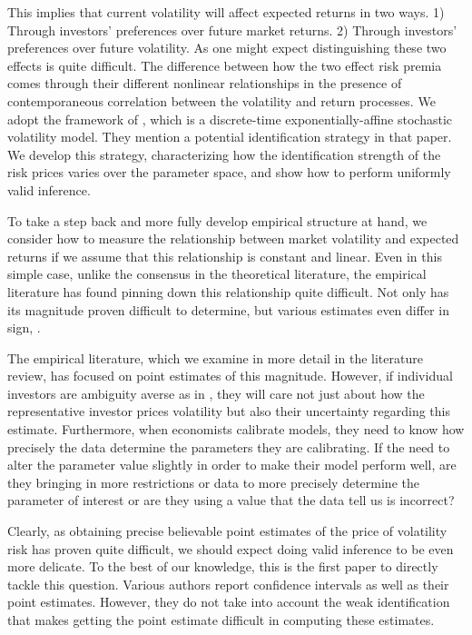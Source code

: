 \documentclass[11pt, letterpaper, twoside, final]{article}
\begin{document}
This implies that current volatility will affect expected returns in two ways. 1) Through investors' preferences
over future market returns. 2) Through investors' preferences over future volatility. 
As one might expect distinguishing these two effects is quite difficult. 
The difference between how the two effect risk premia comes through their different nonlinear relationships in the
presence of contemporaneous correlation between the volatility and return processes. 
We adopt the framework of \textcite{khrapov2016affine}, which is a discrete-time exponentially-affine stochastic
volatility model.
They mention a potential identification strategy in that paper. 
We develop this strategy,  characterizing how the identification strength of the risk prices varies over the
parameter space, and show how to perform uniformly valid inference.

To take a step back and more fully develop empirical structure at hand, we consider how to measure the
relationship between market volatility and expected returns if we assume that this relationship is constant and
linear. 
Even in this simple case, unlike the consensus in the theoretical literature, the empirical literature has found
pinning down this relationship quite difficult.
Not only has its magnitude proven difficult to determine, but various estimates even differ in sign,
\parencite{lettau2010measuring}.

The empirical literature, which we examine in more detail in the literature review, has focused on point estimates
of this magnitude. 
However, if individual investors are ambiguity averse as in \textcite{hansen2001robust, jiu2012ambiguity}, they
will care not just about how the representative investor prices volatility but also their uncertainty regarding
this estimate. 
Furthermore, when economists calibrate models, they need to know how precisely the data determine the parameters
they are calibrating.
If the need to alter the parameter value slightly in order to make their model perform well, are they bringing in
more restrictions or data to more precisely determine the parameter of interest or are they using a value that the
data tell us is incorrect?

Clearly, as obtaining precise believable point estimates of the price of volatility risk has proven quite
difficult, we should expect doing valid inference to be even more delicate.
To the best of our knowledge, this is the first paper to directly tackle this question.
Various authors report confidence intervals as well as their point estimates.
However, they do not take into account the weak identification that makes getting the point estimate difficult in
computing these estimates.
\end{document}
